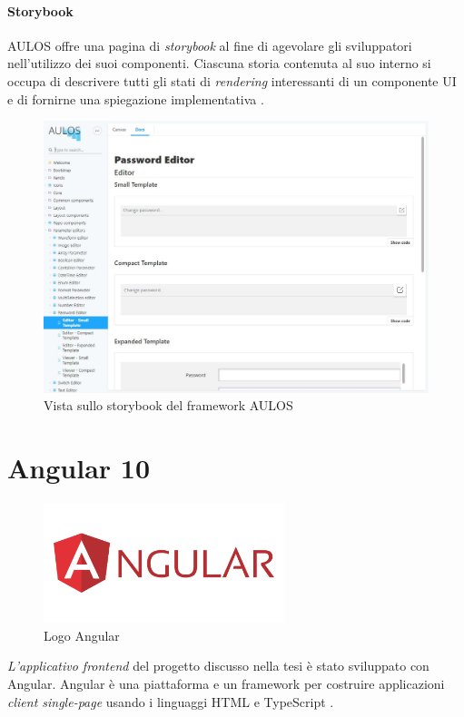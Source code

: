\paragraph{Storybook}
AULOS offre una pagina di \textit{storybook} al fine di agevolare gli sviluppatori nell'utilizzo dei suoi componenti. Ciascuna storia contenuta al suo interno si occupa di descrivere tutti gli stati di \textit{rendering} interessanti di un componente UI e di fornirne una spiegazione implementativa \cite{STORYBOOK}.
\pagebreak
\begin{figure}[h]
\begin{center}
  \includegraphics[width=14cm]{images/aulos_storybook.JPG}
  \caption{Vista sullo storybook del framework AULOS}
\end{center}
\end{figure}

\section{Angular 10}
\begin{figure}[ht!]
\begin{center}
  \includegraphics[width=7cm]{images/angular_logo.png}
  \caption{Logo Angular}
\end{center}
\end{figure}
\FloatBarrier
\textit{L'applicativo frontend} del progetto discusso nella tesi è stato sviluppato con Angular.
Angular è una piattaforma e un framework per costruire applicazioni \textit{client single-page} usando i linguaggi HTML e TypeScript \cite{ANGULAR}. 
